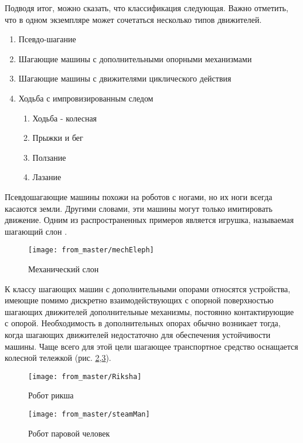 Подводя итог, можно сказать, что классификация следующая. Важно отметить, что в одном экземпляре может сочетаться несколько типов движителей.
\begin{enumerate}
\item Псевдо-шагание
\item Шагающие машины с дополнительными опорными механизмами
\item Шагающие машины с движителями циклического действия
\item Ходьба с импровизированным следом
\begin{enumerate}
\item Ходьба - колесная
\item Прыжки и бег
\item Ползание
\item Лазание
\end{enumerate}
\end{enumerate}

Псевдошагающие машины похожи на роботов с ногами, но их ноги всегда касаются земли. Другими словами, эти машины могут только имитировать движение. Одним из распространенных примеров является игрушка, называемая шагающий слон .


\begin{figure}[H]
\centering\texttt{[image: from\_master/mechEleph]}
\caption{Механический слон}
\label{fig:mechEleph}
\end{figure}

К классу шагающих машин с дополнительными опорами относятся устройства, имеющие помимо дискретно взаимодействующих с опорной поверхностью шагающих движителей дополнительные механизмы, постоянно контактирующие с опорой. Необходимость в дополнительных опорах обычно возникает тогда, когда шагающих движителей недостаточно для обеспечения устойчивости машины. Чаще всего для этой цели шагающее транспортное средство оснащается колесной тележкой (рис. \ref{fig:Riksha},\ref{fig:steamMan})\cite{briskinSintezCiklovogoShagayushchego2011, Petr1986, Brisk2009,2014,2019,Pavl2013}.

\begin{figure}[H]
\centering\texttt{[image: from\_master/Riksha]}
\caption{Робот рикша}
\label{fig:Riksha}
\end{figure}

\begin{figure}[H]
\centering\texttt{[image: from\_master/steamMan]}
\caption{Робот паровой человек}
\label{fig:steamMan}
\end{figure}

